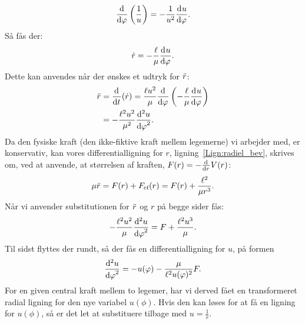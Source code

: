 \begin{align}
	\dif{\phi}{} \left(\frac{1}{u}\right) = -\frac{1}{u^2} \dif{\phi}{u}.
\end{align}
Så fås der:
\begin{align}
	\dt{r} = -\frac{\ell }{\mu} \dif{\phi}{u}.
\end{align}
Dette kan anvendes når der ønskes et udtryk for $\ddt{r}$:
\begin{equation}
\begin{aligned}
	\ddt{r} &= \dif{t}{}(\dt{r}) = \frac{\ell u^2}{\mu} \dif{\phi}{} \left(-\frac{\ell }{\mu} \dif{\phi}{u}\right) \\
	&= -\frac{\ell ^2 u^2}{\mu ^2} \dif[2]{\phi}{u}.
\end{aligned}
\end{equation}
Da den fysiske kraft (den ikke-fiktive kraft mellem legemerne) vi arbejder med, er konservativ, kan vores differentialligning for $r$, ligning~\eqref{Lign:radiel_bev}, skrives om, ved at anvende, at størrelsen af kraften, $F(r) = -\dif{r}{} V(r)$:
\begin{align}
	\mu \ddt{r} = F(r) + F_\text{cf}(r) = F(r) + \frac{\ell ^2}{\mu r^3}.
\end{align}
Når vi anvender substitutionen for $\ddt{r}$ og $r$ på begge sider fås:
\begin{align}
	-\frac{\ell ^2 u^2}{\mu} \dif[2]{\phi}{u} = F + \frac{\ell ^2 u^3}{\mu}.
\end{align}
Til sidst flyttes der rundt, så der fås en differentialligning for $u$, på formen
\begin{align} \label{eq:uDiffLign}
	\dif[2]{\phi}{u} = -u(\phi) - \frac{\mu}{\ell ^2 u(\phi)^2}F.
\end{align}
For en given central kraft mellem to legemer, har vi derved fået en transformeret radial ligning for den nye variabel $u(\phi)$. Hvis den kan løses for at få en ligning for $u(\phi)$, så er det let at substituere tilbage med $u = \frac{1}{r}$.

